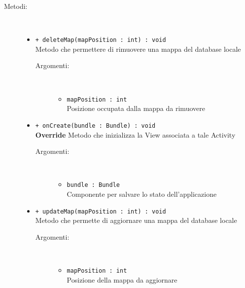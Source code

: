 \documentclass[../DefinizioneDiProdotto.tex]{subfiles}
\begin{document}
\begin{description}
\begin{itemize}
	\end{itemize}
	\item[Metodi:] \
	\begin{itemize}
		\item \texttt{+ deleteMap(mapPosition : int) : void}\\
		Metodo che permettere di rimuovere una mappa del database locale
		\begin{description}
			\item[Argomenti:] \
			\begin{itemize}
				\item \texttt{mapPosition : int}\\
				Posizione occupata dalla mappa da rimuovere\end{itemize}
		\end{description}
		\item \texttt{+ onCreate(bundle : Bundle) : void}\\
		\textbf{Override} Metodo che inizializza la View associata a tale Activity
		\begin{description}
			\item[Argomenti:] \
			\begin{itemize}
				\item \texttt{bundle : Bundle}\\
				Componente per salvare lo stato dell'applicazione\end{itemize}
		\end{description}
		\item \texttt{+ updateMap(mapPosition : int) : void}\\
		Metodo che permette di aggiornare una mappa del database locale
		\begin{description}
			\item[Argomenti:] \
			\begin{itemize}
				\item \texttt{mapPosition : int}\\
				Posizione della mappa da aggiornare\end{itemize}
		\end{description}
	\end{itemize}
\end{description}
\end{document}
